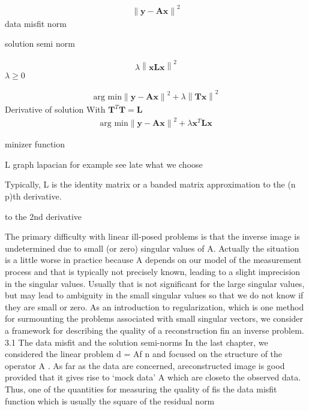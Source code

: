 \begin{align}
	\left\lVert \bm{y} - \bm{A}\bm{x}  \right\rVert^2
\end{align}
data misfit norm

solution semi norm

\begin{align}
	\lambda \left\lVert \bm{x}\bm{L}\bm{x}  \right\rVert^2
\end{align}
$\lambda \geq 0$

\begin{align}
	\text{arg min} \left\lVert \bm{y} - \bm{A}\bm{x}  \right\rVert^2 + \lambda \left\lVert \bm{T}\bm{x}  \right\rVert^2
\end{align}
Derivative of solution
With $   \bm{T}^T \bm{T} = \bm{L}$
\begin{align}
	\text{arg min} \left\lVert \bm{y} - \bm{A}\bm{x}  \right\rVert^2 + \lambda \bm{x}^T  \bm{L}\bm{x} 
\end{align}

minizer function

L graph lapacian for example see late what we choose

Typically, L is the identity matrix or
a banded matrix approximation to the (n  p)th derivative.

to the 2nd derivative




The primary difficulty with linear ill-posed problems is that the inverse image is undetermined
due to small (or zero) singular values of A. Actually the situation is a little worse in practice
because A depends on our model of the measurement process and that is typically not
precisely known, leading to a slight imprecision in the singular values. Usually that is not
significant for the large singular values, but may lead to ambiguity in the small singular values
so that we do not know if they are small or zero.
As an introduction to regularization, which is one method for surmounting the problems
associated with small singular vectors, we consider a framework for describing the quality of
a reconstruction fin an inverse problem.
3.1
The data misfit and the solution semi-norms
In the last chapter, we considered the linear problem
d = Af  n
and focused on the structure of the operator A
 . As far as the data are concerned, areconstructed image is good provided that it gives rise to ‘mock data’ A which are closeto the observed data. Thus, one of the quantities for measuring the quality of fis the data
misfit function which is usually the square of the residual norm


